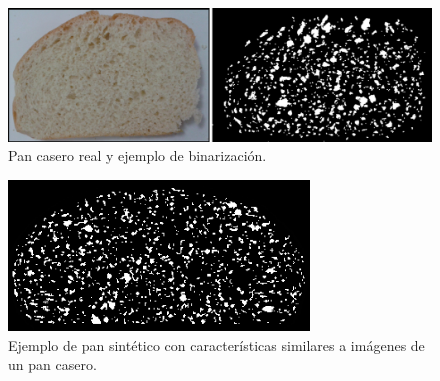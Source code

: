 \begin{figure}[!ht]
\begin{center}
\includegraphics[width=13cm]{figures/realbin2}
\caption{ Pan casero real y ejemplo de binarización.}
\label{realbin2}
\end{center}
\end{figure}

\begin{figure}[!ht]
\begin{center}
\includegraphics[width=8cm]{figures/best2}
\caption{Ejemplo de pan sintético con características similares a imágenes de un pan casero.}
\label{best2}
\end{center}
\end{figure}






